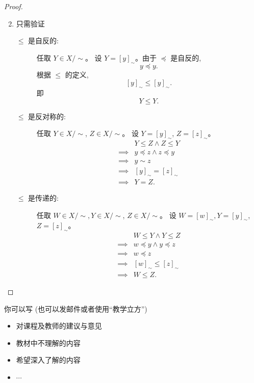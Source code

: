 \documentclass[a4paper, justified]{tufte-handout}
\begin{document}
\begin{proof}
  \begin{enumerate}[(1)]
    \setcounter{enumi}{1}
    \item 只需验证
      \begin{description}
        \item[$\le$ 是自反的:] 任取 $Y \in X/\sim$。
          设 $Y = [y]_{\sim}$。由于 $\preceq$ 是自反的,
          \[
            y \preceq y.
          \]
          根据 $\le$ 的定义,
          \[
            [y]_{\sim} \le [y]_{\sim}.
          \]
          即
          \[
            Y \le Y.
          \]
        \item[$\le$ 是反对称的:]
          任取 $Y \in X/\sim$, $Z \in X/\sim$。
          设 $Y = [y]_{\sim}$, $Z = [z]_{\sim}$。
          \begin{align*}
            &Y \le Z \land Z \le Y \\
            \implies & y \preceq z \land z \preceq y \\
            \implies & y \sim z \\
            \implies & [y]_{\sim} = [z]_{\sim} \\
            \implies & Y = Z.
          \end{align*}
        \item[$\le$ 是传递的:]
          任取 $W\in X/\sim, Y \in X/\sim$, $Z \in X/\sim$。
          设 $W = [w]_{\sim}, Y = [y]_{\sim}$, $Z = [z]_{\sim}$。
          \begin{align*}
            & W \le Y \land Y \le Z \\
            \implies & w \preceq y \land y \preceq z \\
            \implies & w \preceq z \\
            \implies & [w]_{\sim} \le [z]_{\sim} \\
            \implies & W \le Z.
          \end{align*}
      \end{description}
  \end{enumerate}
\end{proof}

\begincorrection

\beginfb

你可以写 (也可以发邮件或者使用``教学立方'')
\begin{itemize}
  \item 对课程及教师的建议与意见
  \item 教材中不理解的内容
  \item 希望深入了解的内容
  \item $\cdots$
\end{itemize}
\end{document}
